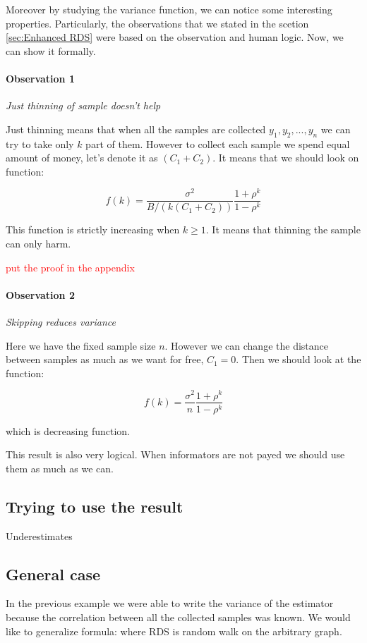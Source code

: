 \documentclass[12pt]{report}
\newcommand\myworries[1]{\textcolor{red}{#1}}
\begin{document}
Moreover by studying the variance function, we can notice some interesting properties. Particularly, the observations that we stated in the scetion \ref{sec:Enhanced RDS} were based on the observation and human logic. Now, we can show it formally.

\paragraph{Observation 1} \textit{Just thinning of sample doesn't help}

Just thinning means that when all the samples are collected $y_1, y_2, ...,y_n$ we can try to take only $k$ part of them. However to collect each sample we spend equal amount of money, let's denote it as $(C_1+C_2)$. It means that we should look on function:

$$ f(k) = \frac{\sigma^2}{B/(k(C_1 + C_2))} \frac{1+\rho^{k}}{1-\rho^{k}}$$

This function is strictly increasing when $k \geq 1$. It means that thinning the sample can only harm. 

\myworries{put the proof in the appendix}

\paragraph{Observation 2} \textit{Skipping reduces variance}

Here we have the fixed sample size $n$. However we can change the distance between samples as much as we want for free, $C_1 = 0$. Then we should look at the function:

$$ f(k) = \frac{\sigma^2}{n} \frac{1+\rho^{k}}{1-\rho^{k}}$$

which is decreasing function.

This result is also very logical. When informators are not payed we should use them as much as we can.

\subsection{Trying to use the result}

Underestimates
\subsection{General case}

In the previous example we were able to write the variance of the estimator because the correlation between all the collected samples was known. We would like to generalize formula: where RDS is random walk on the arbitrary graph.
\end{document}
